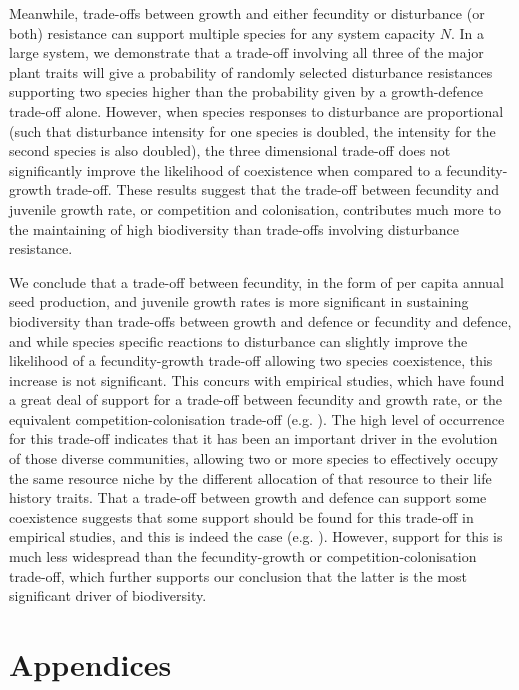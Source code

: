 Meanwhile, trade-offs between growth and either fecundity or disturbance (or both) resistance can support multiple species for any system capacity $N$. In a large system, we demonstrate that a trade-off involving all three of the major plant traits will give a probability of randomly selected disturbance resistances supporting two species higher than the probability given by a growth-defence trade-off alone. However, when species responses to disturbance are proportional (such that disturbance intensity for one species is doubled, the intensity for the second species is also doubled), the three dimensional trade-off does not significantly improve the likelihood of coexistence when compared to a fecundity-growth trade-off. These results suggest that the trade-off between fecundity and juvenile growth rate, or competition and colonisation, contributes much more to the maintaining of high biodiversity than trade-offs involving disturbance resistance.  


We conclude that a trade-off between fecundity, in the form of per capita annual seed production, and juvenile growth rates is more significant in sustaining biodiversity than trade-offs between growth and defence or fecundity and defence, and while species specific reactions to disturbance can slightly improve the likelihood of a fecundity-growth trade-off allowing two species coexistence, this increase is not significant. This concurs with empirical studies, which have found a great deal of support for a trade-off between fecundity and growth rate, or the equivalent competition-colonisation trade-off (e.g. \cite{levins1971regional,yu2001competition,tilman1994competition,adler2000space}). The high level of occurrence for this trade-off indicates that it has been an important driver in the evolution of those diverse communities, allowing two or more species to effectively occupy the same resource niche by the different allocation of that resource to their life history traits. That a trade-off between growth and defence can support some coexistence suggests that some support should be found for this trade-off in empirical studies, and this is indeed the case (e.g. \cite{wright2010functional,fine2006growth}). However, support for this is much less widespread than the fecundity-growth or competition-colonisation trade-off, which further supports our conclusion that the latter is the most significant driver of biodiversity.

\section*{Appendices}
 \appendix
